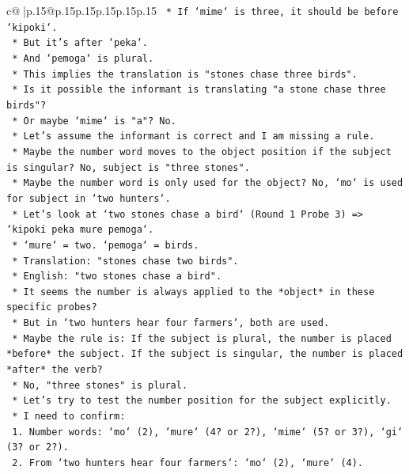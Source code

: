 \documentclass{article}
\begin{document}
{\begin{supertabular}{c@{$\;$}|p{.15\linewidth}@{}p{.15\linewidth}p{.15\linewidth}p{.15\linewidth}p{.15\linewidth}p{.15\linewidth}}
{{{\texttt{        *   If `mime` is three, it should be before `kipoki`.} \\
\texttt{        *   But it's after `peka`.} \\
\texttt{        *   And `pemoga` is plural.} \\
\texttt{        *   This implies the translation is "stones chase three birds".} \\
\texttt{        *   Is it possible the informant is translating "a stone chase three birds"?} \\
\texttt{        *   Or maybe `mime` is "a"? No.} \\
\texttt{        *   Let's assume the informant is correct and I am missing a rule.} \\
\texttt{        *   Maybe the number word moves to the object position if the subject is singular? No, subject is "three stones".} \\
\texttt{        *   Maybe the number word is only used for the object? No, `mo` is used for subject in `two hunters`.} \\
\texttt{        *   Let's look at `two stones chase a bird` (Round 1 Probe 3) => `kipoki peka mure pemoga`.} \\
\texttt{        *   `mure` = two. `pemoga` = birds.} \\
\texttt{        *   Translation: "stones chase two birds".} \\
\texttt{        *   English: "two stones chase a bird".} \\
\texttt{        *   It seems the number is always applied to the *object* in these specific probes?} \\
\texttt{        *   But in `two hunters hear four farmers`, both are used.} \\
\texttt{        *   Maybe the rule is: If the subject is plural, the number is placed *before* the subject. If the subject is singular, the number is placed *after* the verb?} \\
\texttt{        *   No, "three stones" is plural.} \\
\texttt{        *   Let's try to test the number position for the subject explicitly.} \\
\texttt{        *   I need to confirm:} \\
\texttt{            1.  Number words: `mo` (2), `mure` (4? or 2?), `mime` (5? or 3?), `gi` (3? or 2?).} \\
\texttt{            2.  From `two hunters hear four farmers`: `mo` (2), `mure` (4).} \\
}}}
\end{supertabular}}
\end{document}
